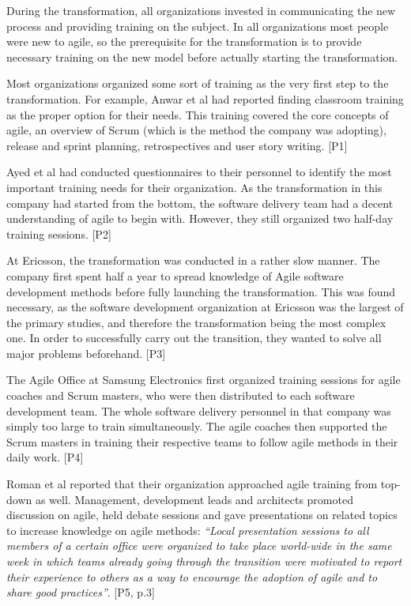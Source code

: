 During the transformation, all organizations invested in communicating
the new process and providing training on the subject. In all
organizations most people were new to agile, so the prerequisite for the
transformation is to provide necessary training on the new model before
actually starting the transformation.

Most organizations organized some sort of training as the very first
step to the transformation. For example, Anwar et al had reported
finding classroom training as the proper option for their needs. This
training covered the core concepts of agile, an overview of Scrum (which
is the method the company was adopting), release and sprint planning,
retrospectives and user story writing. [P1]

Ayed et al had conducted questionnaires to their personnel to identify
the most important training needs for their organization. As the
transformation in this company had started from the bottom, the software
delivery team had a decent understanding of agile to begin with.
However, they still organized two half-day training sessions. [P2]

At Ericsson, the transformation was conducted in a rather slow manner.
The company first spent half a year to spread knowledge of Agile
software development methods before fully launching the transformation.
This was found necessary, as the software development organization at
Ericsson was the largest of the primary studies, and therefore the
transformation being the most complex one. In order to successfully
carry out the transition, they wanted to solve all major problems
beforehand. [P3]

The Agile Office at Samsung Electronics first organized training
sessions for agile coaches and Scrum masters, who were then distributed
to each software development team. The whole software delivery personnel
in that company was simply too large to train simultaneously. The agile
coaches then supported the Scrum masters in training their respective
teams to follow agile methods in their daily work. [P4]

Roman et al reported that their organization approached agile
training from top-down as well. Management, development leads and
architects promoted discussion on agile, held debate sessions and gave
presentations on related topics to increase knowledge on agile methods:
\textit{``Local presentation sessions to all members of a certain office
were organized to take place world-wide in the same week in which teams
already going through the transition were motivated to report their
experience to others as a way to encourage the adoption of agile and to
share good practices''}. [P5, p.3]

